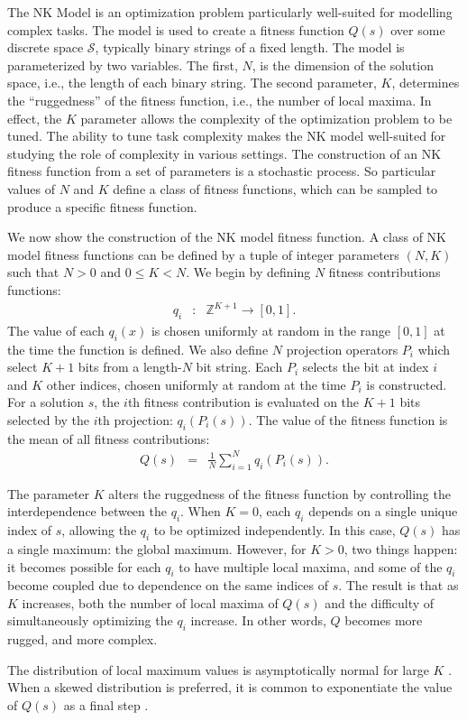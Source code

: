 The NK Model \cite{kauffman_towards_1987} is an optimization problem particularly well-suited for modelling complex tasks. The model is used to create a fitness function $Q(s)$ over some discrete space $\mathcal{S}$, typically binary strings of a fixed length.
The model is parameterized by two variables.
The first, $N$, is the dimension of the solution space, i.e., the length of each binary string.
The second parameter, $K$, determines the ``ruggedness'' of the fitness function, i.e., the number of local maxima.
In effect, the $K$ parameter allows the complexity of the optimization problem to be tuned.
The ability to tune task complexity makes the NK model well-suited for studying the role of complexity in various settings.
The construction of an NK fitness function from a set of parameters is a stochastic process.
So particular values of $N$ and $K$ define a class of fitness functions, which can be sampled to produce a specific fitness function.

We now show the construction of the NK model fitness function.
A class of NK model fitness functions can be defined by a tuple of integer parameters
$(N, K)$ such that $N > 0$ and $0 \leq K < N$.
We begin by defining $N$ fitness contributions functions:
\begin{eqnarray}
q_i &:& \mathbb{Z}^{K+1} \rightarrow [0, 1].
\end{eqnarray}
The value of each $q_i(x)$ is chosen uniformly at random in the range $[0, 1]$ at the time the function is defined.
We also define $N$ projection operators $P_i$ which select $K+1$ bits from a length-$N$ bit string.
Each $P_i$ selects the bit at index $i$ and $K$ other indices, chosen uniformly at random at the time $P_i$ is constructed.
For a solution $s$, the $i$th fitness contribution is evaluated on the $K + 1$ bits selected by the $i$th projection: $q_i(P_i(s))$.
The value of the fitness function is the mean of all fitness contributions:
\begin{eqnarray}
Q(s) &=& \frac{1}{N}\sum_{i=1}^N q_i(P_i(s)).
\end{eqnarray}

The parameter $K$ alters the ruggedness of the fitness function by controlling the interdependence between the $q_i$.
When $K = 0$, each $q_i$ depends on a single unique index of $s$,
allowing the $q_i$ to be optimized independently.
In this case, $Q(s)$ has a single maximum: the global maximum.
However, for $K > 0$, two things happen: it becomes possible for each $q_i$ to have multiple local maxima, and some of the $q_i$ become coupled due to dependence on the same indices of $s$.
The result is that as $K$ increases, both the number of local maxima of $Q(s)$ \cite{weinberger_local_1991} and the difficulty of simultaneously optimizing the $q_i$ increase.
In other words, $Q$ becomes more rugged, and more complex.

The distribution of local maximum values is asymptotically normal for large $K$ \cite{weinberger_local_1991}.
When a skewed distribution is preferred, it is common to exponentiate the value of $Q(s)$ as a final step \cite{lazer_network_2007, barkoczi_social_2016, gomez_clustering_2019}.

